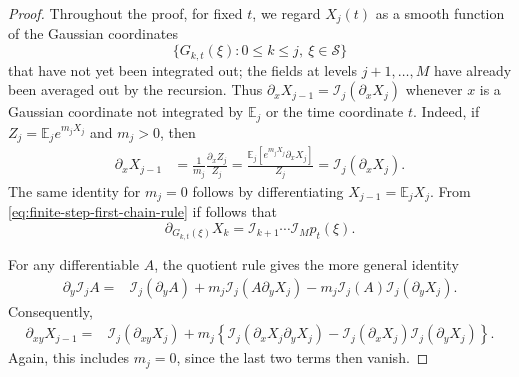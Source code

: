 \documentclass[11pt]{article}
\numberwithin{equation}{section}
\newcommand{\E}{\mathbb{E}}
\newcommand{\1}{\mathbf 1}
\begin{document}
\begin{proof}
Throughout the proof, for fixed $t$, we regard $X_j(t)$ as a smooth function of the Gaussian coordinates
\[
\{G_{k,t}(\xi):0\leq k\leq j,\ \xi\in\mathcal S\}
\]
that have not yet been integrated out; the fields at levels
$j+1,\ldots,M$ have already been averaged out by the recursion.
Thus $\partial_xX_{j-1}=\mathcal I_j(\partial_xX_j)$ whenever $x$ is
a Gaussian coordinate not integrated by $\E_j$ or the time coordinate $t$.  Indeed, if
$Z_j=\E_je^{m_jX_j}$ and $m_j>0$, then
\begin{align}
\partial_xX_{j-1}
&=\frac1{m_j}\frac{\partial_xZ_j}{Z_j}
=\frac{\E_j[e^{m_jX_j}\partial_xX_j]}{Z_j}
=\mathcal I_j(\partial_xX_j).
\label{eq:finite-step-first-chain-rule}
\end{align}
The same identity for $m_j=0$ follows by differentiating
$X_{j-1}=\E_jX_j$.
From \eqref{eq:finite-step-first-chain-rule} if follows that
\begin{equation}\label{eq:dX=IP}
\partial_{G_{k,t}(\xi)}X_k =\mathcal I_{k+1}\cdots\mathcal I_Mp_t(\xi).
\end{equation}

For any differentiable $A$, the quotient rule gives the more general
identity
\begin{align}
\partial_y\mathcal I_jA
={}&\mathcal I_j(\partial_yA)
+m_j\mathcal I_j(A\partial_yX_j)
-m_j\mathcal I_j(A)\mathcal I_j(\partial_yX_j).
\label{eq:derivative-tilted-expectation}
\end{align}
Consequently,
\begin{align}
\partial_{xy}X_{j-1}
={}&\mathcal I_j(\partial_{xy}X_j)
+m_j\left\{
\mathcal I_j(\partial_xX_j\partial_yX_j)
-\mathcal I_j(\partial_xX_j)
 \mathcal I_j(\partial_yX_j)
\right\}.
\label{eq:finite-step-second-chain-rule}
\end{align}
Again, this includes $m_j=0$, since the last two terms then vanish.


\end{proof}
\end{document}
